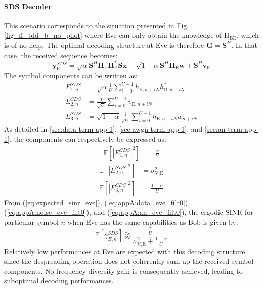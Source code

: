 \documentclass[journal,comsoc]{IEEEtran}
\newcommand{\EX}[1]{\mathbb{E} \left[#1\right]}%
\newcommand{\HE}{\textbf{H}_{\text{E}}}
\newcommand{\ve}{\textbf{v}_{\text{E}}}
\newcommand{\spread}{\textbf{S}}
\newcommand{\w}{\textbf{w}}
\newcommand{\mat}[1]{\boldsymbol{\mathrm{#1}}}
\begin{document}
\paragraph{SDS Decoder}
\label{sec:same-decoding-strucure-as-bob}
This scenario corresponds to the situation presented in Fig.\ref{fig_ff_tdd_b_no_pilot} where Eve can only obtain the knowledge of $\mat{H}_{\text{BE}}$, which is of no help. The optimal decoding structure at Eve is therefore $\textbf{G}=\spread^H$. In that case, the received sequence becomes:
\begin{equation}
\textbf{y}_{\text{E}}^{SDS} = \sqrt{\alpha} \spread^H \HE \textbf{H}^*_{\text{B}} \spread\textbf{x} + \sqrt{1-\alpha} \spread^H \HE \w  +  \spread^H  \ve 
\label{eq:rx_eve_filt0}
\end{equation}
The symbol components can be written as:
\begin{equation}
\begin{split}
E_{1,n}^{SDS} &= \sqrt{\alpha}\frac{1}{U}\sum_{i=0}^{U-1}  h_{\text{E}, n + iN} h^*_{\text{B}, n + iN} \\
E_{2,n}^{SDS} &= \frac{1}{\sqrt{U}}\sum_{i=0}^{U-1}  v_{\text{E}, n + iN}\\
E_{3,n}^{SDS} &= \sqrt{1-\alpha}\frac{1}{\sqrt{U}}\sum_{i=0}^{U-1}  h_{\text{E}, n + iN}w_{n + iN}
\end{split}
\end{equation}
As detailed in  \ref{sec:data-term-app-1},  \ref{sec:awgn-term-app-1}, and \ref{sec:an-term-app-1}, the components can respectively be expressed as:
\begin{equation}
	\begin{split}
	\EX{|E_{1,n}^{SDS}|^2}&= \frac{\alpha}{U}
	\end{split}
	\label{eq:appA:data_eve_filt0}
\end{equation} 
\begin{equation}
	\begin{split}
	\EX{|E_{2,n}^{SDS}|^2} &=\sigma^2_{\text{V,E}}
	\end{split}
	\label{eq:appA:noise_eve_filt0}
\end{equation} 
\begin{equation}
	\begin{split}
	\EX{|E_{3,n}^{SDS}|^2}  &= \frac{1-\alpha}{U}
	\end{split}
	\label{eq:appA:an_eve_filt0}
\end{equation}
From (\ref{eq:expected_sinr_eve}), (\ref{eq:appA:data_eve_filt0}), (\ref{eq:appA:noise_eve_filt0}), and (\ref{eq:appA:an_eve_filt0}), the ergodic SINR for particular symbol $n$ when Eve has the same capabilities as Bob is given by:
\begin{equation}
\EX{\gamma_{E,n}^{SDS}} \gtrapprox \frac{\frac{\alpha}{U}}{\sigma^2_{\text{V,E}}+\frac{1-\alpha}{U}}
\label{eq:sinr_eve_filt0}
\end{equation}
Relatively low performances at Eve are expected with this decoding structure since the despreading operation does not coherently sum up the received symbol components. No frequency diversity gain is consequently achieved, leading to suboptimal decoding performances.
\end{document}

